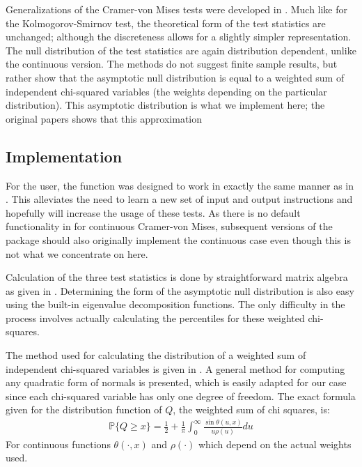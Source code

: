 \documentclass[article]{jss}
\begin{document}
Generalizations of the Cramer-von Mises tests were developed in \cite{choulakian1994}. Much like for the Kolmogorov-Smirnov test,
the theoretical form of the test statistics are unchanged; although the discreteness allows for a slightly simpler representation.
The null distribution of the test statistics are again distribution dependent, unlike the continuous version. The methods do not
suggest finite sample results, but rather show that the asymptotic null distribution is equal to a weighted sum of independent
chi-squared variables (the weights depending on the particular distribution). This asymptotic distribution is what we implement here;
the original papers shows that this approximation 

\subsection{Implementation}

For the user, the function  was designed to work in exactly the same manner as  in . This
alleviates the need to learn a new set of input and output instructions and hopefully will increase the usage of these tests. 
As there is no default functionality in  for continuous Cramer-von Mises, subsequent versions of the package
should also originally implement the continuous case even though this is not what we concentrate on here. 

Calculation of the three test statistics is done by straightforward matrix algebra as given in \cite{choulakian1994}. Determining 
the form of the asymptotic null distribution is also easy using the built-in eigenvalue decomposition functions. The only 
difficulty in the process involves actually calculating the percentiles for these weighted chi-squares. 

The method used for calculating the distribution of a weighted sum of independent chi-squared variables is given in \cite{imhof1961}.
A general method for computing any quadratic form of normals is presented, which is easily adapted for our case since
each chi-squared variable has only one degree of freedom. The exact formula given for the distribution function of $Q$, the weighted
sum of chi squares, is:
\begin{align*}
\mathbb{P}\{Q \geq x \} = \frac{1}{2} + \frac{1}{\pi} \int_{0}^{\infty} \frac{\sin\theta(u,x)}{u \rho(u) } du
\end{align*}
For continuous functions $\theta(\cdot, x)$ and $\rho(\cdot)$ which depend on the actual weights used. 
\end{document}
